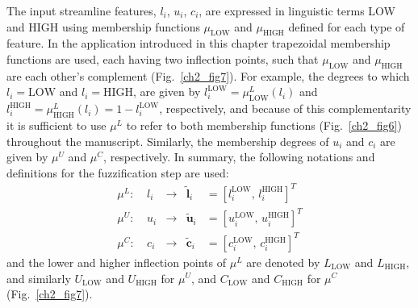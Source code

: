 The input streamline features, $l_{i}$, $u_{i}$, $c_{i}$, are expressed in linguistic terms LOW and HIGH using membership functions $\mu_{\textrm{LOW}}$ and $\mu_{\textrm{HIGH}}$ defined for each type of feature. In the application introduced in this chapter trapezoidal membership functions are used, each having two inflection points, such that $\mu_{\textrm{LOW}}$ and $\mu_{\textrm{HIGH}}$ are each other's complement (Fig.~\ref{ch2_fig7}). For example, the degrees to which $l_{i}=\textrm{LOW}$ and $l_{i}=\textrm{HIGH}$, are given by $l_{i}^{\textrm{LOW}}=\mu^{L}_{\textrm{LOW}}(l_{i})$ and $l_{i}^{\textrm{HIGH}}=\mu^{L}_{\textrm{HIGH}}(l_{i})=1-l_{i}^{\textrm{LOW}}$, respectively, and because of this complementarity it is sufficient to use $\mu^{L}$  to refer to both membership functions (Fig.~\ref{ch2_fig6}) throughout the manuscript. Similarly, the membership degrees of $u_{i}$ and $c_{i}$ are given by $\mu^{U}$ and $\mu^{C}$, respectively. In summary, the following notations and definitions for the fuzzification step are used:
\begin{equation}
\begin{array}{lcccl}
\mu^{L}\!:\ & l_{i} & \rightarrow & \tilde{\mathbf{l}}_{i} & = \left[l_{i}^{\textrm{LOW}}\!,\, l_{i}^{\textrm{HIGH}}\right]^T \\[1ex]
\mu^{U}\!:\ & u_{i} & \rightarrow & \tilde{\mathbf{u}}_{i} & = \left[u_{i}^{\textrm{LOW}}\!,\, u_{i}^{\textrm{HIGH}}\right]^T \\[1ex]
\mu^{C}\!:\ & c_{i} & \rightarrow & \tilde{\mathbf{c}}_{i} & = \left[c_{i}^{\textrm{LOW}}\!,\, c_{i}^{\textrm{HIGH}}\right]^T
\end{array}
\end{equation}
and the lower and higher inflection points of $\mu^{L}$ are denoted by $L_{\textrm{LOW}}$ and $L_{\textrm{HIGH}}$, and similarly $U_{\textrm{LOW}}$ and $U_{\textrm{HIGH}}$ for $\mu^{U}$, and $C_{\textrm{LOW}}$ and $C_{\textrm{HIGH}}$ for $\mu^{C}$ (Fig.~\ref{ch2_fig7}).

